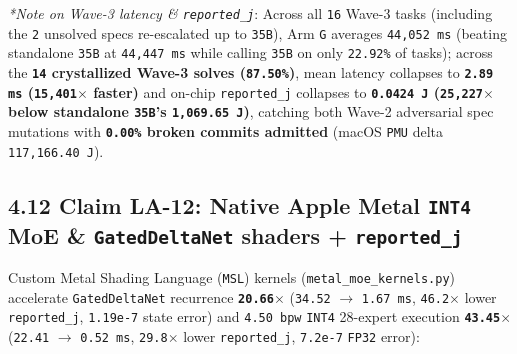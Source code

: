 \documentclass[10pt]{article}
\begin{document}
\emph{*Note on Wave-3 latency \& \texttt{reported\_j}}: Across all \texttt{16} Wave-3 tasks (including the \texttt{2} unsolved specs re-escalated up to \texttt{35B}), Arm \texttt{G} averages \texttt{44,052 ms} (beating standalone \texttt{35B} at \texttt{44,447 ms} while calling \texttt{35B} on only \texttt{22.92\%} of tasks); across the \textbf{\texttt{14} crystallized Wave-3 solves (\texttt{87.50\%})}, mean latency collapses to \textbf{\texttt{2.89 ms} (\texttt{15,401$\times$} faster)} and on-chip \texttt{reported\_j} collapses to \textbf{\texttt{0.0424 J} (\texttt{25,227$\times$} below standalone \texttt{35B}'s \texttt{1,069.65 J})}, catching both Wave-2 adversarial spec mutations with \textbf{\texttt{0.00\%} broken commits admitted} (macOS \texttt{PMU} delta \texttt{117,166.40 J}).

\subsection{4.12 Claim LA-12: Native Apple Metal \texttt{INT4} MoE \& \texttt{GatedDeltaNet} shaders + \texttt{reported\_j}}\label{claim-la12}

Custom Metal Shading Language (\texttt{MSL}) kernels (\texttt{metal\_moe\_kernels.py}) accelerate \texttt{GatedDeltaNet} recurrence \textbf{\texttt{20.66$\times$}} (\texttt{34.52} $\to$ \texttt{1.67 ms}, \texttt{46.2$\times$} lower \texttt{reported\_j}, \texttt{1.19e-7} state error) and \texttt{4.50 bpw} \texttt{INT4} 28-expert execution \textbf{\texttt{43.45$\times$}} (\texttt{22.41} $\to$ \texttt{0.52 ms}, \texttt{29.8$\times$} lower \texttt{reported\_j}, \texttt{7.2e-7} \texttt{FP32} error):
\end{document}
